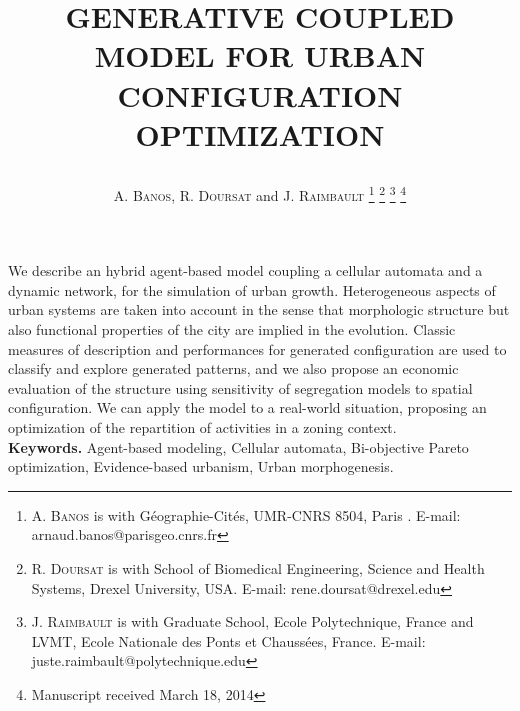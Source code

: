 \documentclass[a4paper,twocolumn,twoside,10pt]{article}
\newcommand{\noun}[1]{\textsc{#1}}
\begin{document}
\def \thepage {}
\date{}

\title{\begin{flushleft}
\end{flushleft}\Large\bf \uppercase{Generative coupled model for Urban configuration optimization} }

\author{ \noun{A. Banos}, \noun{R. Doursat} and  \noun{ J. Raimbault}
 \thanks{\noun{A. Banos} is with G\'eographie-Cit\'es, UMR-CNRS 8504, Paris . E-mail:
arnaud.banos@parisgeo.cnrs.fr}
 \thanks{\noun{R. Doursat} is with School of Biomedical Engineering,
   Science and Health Systems, Drexel University, USA. E-mail:
rene.doursat@drexel.edu}
 \thanks{\noun{J. Raimbault} is with Graduate School, Ecole
   Polytechnique, France and LVMT, Ecole Nationale des Ponts et
   Chauss\'ees, France. E-mail:
juste.raimbault@polytechnique.edu}
\thanks{Manuscript received March 18, 2014}\\[20mm]}

 \maketitle





{\footnotesize {}  We describe an hybrid agent-based model coupling a cellular automata
and a dynamic network, for the simulation of urban growth. Heterogeneous
aspects of urban systems are taken into account in the sense that
morphologic structure but also functional properties of the city are
implied in the evolution. Classic measures of description and performances
for generated configuration are used to classify and explore generated
patterns, and we also propose an economic evaluation of the structure
using sensitivity of segregation models to spatial configuration.
We can apply the model to a real-world situation, proposing an optimization
of the repartition of activities in a zoning context. \\
{\bf Keywords.} Agent-based modeling, Cellular automata, Bi-objective
Pareto optimization, Evidence-based urbanism, Urban morphogenesis.}
\end{document}
